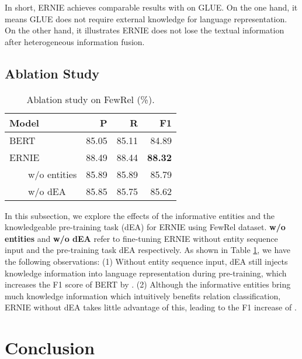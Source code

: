 \documentclass[11pt,a4paper]{article}
\begin{document}
In short, ERNIE achieves comparable results with  on GLUE. On the one hand, it means GLUE does not require external knowledge for language representation. On the other hand, it illustrates ERNIE does not lose the textual information after heterogeneous information fusion.

\subsection{Ablation Study}

\begin{table}[t]
\centering
\scriptsize
\begin{tabular}{l|rrr}
  \toprule
  Model & P & R & F1\\
  \midrule
  BERT & 85.05 & 85.11 & 84.89 \\
  \midrule
  ERNIE & 88.49 & 88.44 & \textbf{88.32} \\
  \ \ \ \ w/o entities & 85.89 & 85.89 & 85.79 \\
  \ \ \ \ w/o dEA & 85.85 & 85.75 & 85.62 \\
  \bottomrule
\end{tabular}
\caption{Ablation study on FewRel (\%).}
\label{tab-re-ablation}
\vspace{-3mm}
\end{table}

In this subsection, we explore the effects of the informative entities and the knowledgeable pre-training task (dEA) for ERNIE using FewRel dataset. \textbf{w/o entities} and \textbf{w/o dEA} refer to fine-tuning ERNIE without entity sequence input and the pre-training task dEA respectively. As shown in Table \ref{tab-re-ablation}, we have the following observations: (1) Without entity sequence input, dEA still injects knowledge information into language representation during pre-training, which increases the F1 score of BERT by . (2) Although the informative entities bring much knowledge information which intuitively benefits relation classification, ERNIE without dEA takes little advantage of this, leading to the F1 increase of .

\section{Conclusion}
\end{document}

